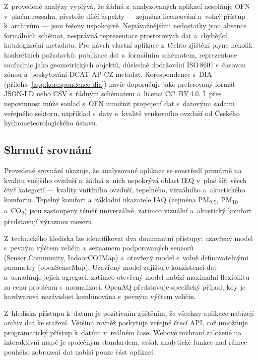 Z~provedené analýzy vyplývá, že žádná z~analyzovaných aplikací nesplňuje OFN v~plném rozsahu, přestože dílčí aspekty --- zejména licencování a~volný přístup k~archivům --- jsou řešeny uspokojivě. Nejzávažnějšími nedostatky jsou absence formálních schémat, nesprávná reprezentace prostorových dat a~chybějící katalogizační metadata. Pro návrh vlastní aplikace z~těchto zjištění plyne několik konkrétních požadavků: publikace dat s~formálním schématem, reprezentace souřadnic jako geometrických objektů, důsledné dodržování ISO\,8601 s~časovou zónou a~poskytování DCAT-AP-CZ metadat. Korespondence s~DIA (příloha~\ref{app:korespondence-dia}) navíc doporučuje jako preferovaný formát JSON-LD nebo CSV s~řádným schématem a~licenci CC~BY\,4.0. I~přes nepovinnost může soulad s~OFN umožnit propojení dat s~datovými sadami veřejného sektoru, například s~daty o~kvalitě venkovního ovzduší od Českého hydrometeorologického ústavu.

\FloatBarrier
\subsection{Shrnutí srovnání}

Provedené srovnání ukazuje, že analyzované aplikace se soustředí primárně na kvalitu vnějšího ovzduší a~žádná z~nich nepokrývá oblast IEQ v~plné šíři všech čtyř kategorií --- kvality vnitřního ovzduší, tepelného, vizuálního a~akustického komfortu. Tepelný komfort a~základní ukazatele IAQ (zejména PM\textsubscript{2,5}, PM\textsubscript{10} a~CO\textsubscript{2}) jsou zastoupeny téměř univerzálně, zatímco vizuální a~akustický komfort představují výraznou mezeru.

Z~technického hlediska lze identifikovat dva dominantní přístupy: uzavřený model s~pevným výčtem veličin a~seznamem podporovaných senzorů (Sensor.Community, IndoorCO2Map) a~otevřený model s~volně definovatelnými parametry (openSenseMap). Uzavřený model zajišťuje konzistenci dat a~usnadňuje jejich agregaci, zatímco otevřený model nabízí maximální flexibilitu za cenu problémů s~normalizací. OpenAQ představuje specifický případ, kdy je hardwarová nezávislost kombinována s~pevným výčtem veličin.

Z~hlediska přístupu k~datům je pozitivním zjištěním, že všechny aplikace nabízejí archiv dat ke stažení. Většina rovněž poskytuje veřejné čtecí API, což umožňuje programatický přístup k~datům v~reálném čase. Webové rozhraní založené na interaktivní mapě je společným standardem, avšak analytické funkce nad rámec pouhého zobrazení dat nabízí pouze část aplikací.

